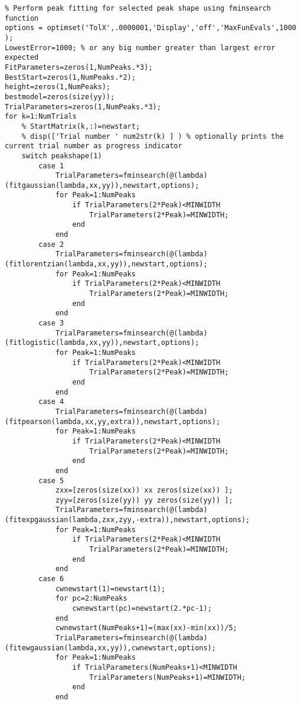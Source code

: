 \begin{lstlisting}
% Perform peak fitting for selected peak shape using fminsearch function
options = optimset('TolX',.0000001,'Display','off','MaxFunEvals',1000 );
LowestError=1000; % or any big number greater than largest error expected
FitParameters=zeros(1,NumPeaks.*3); 
BestStart=zeros(1,NumPeaks.*2); 
height=zeros(1,NumPeaks); 
bestmodel=zeros(size(yy));
TrialParameters=zeros(1,NumPeaks.*3);
for k=1:NumTrials
    % StartMatrix(k,:)=newstart;
    % disp(['Trial number ' num2str(k) ] ) % optionally prints the current trial number as progress indicator
    switch peakshape(1)
        case 1
            TrialParameters=fminsearch(@(lambda)(fitgaussian(lambda,xx,yy)),newstart,options);
            for Peak=1:NumPeaks
                if TrialParameters(2*Peak)<MINWIDTH
                    TrialParameters(2*Peak)=MINWIDTH;
                end
            end
        case 2
            TrialParameters=fminsearch(@(lambda)(fitlorentzian(lambda,xx,yy)),newstart,options);
            for Peak=1:NumPeaks
                if TrialParameters(2*Peak)<MINWIDTH
                    TrialParameters(2*Peak)=MINWIDTH;
                end
            end
        case 3
            TrialParameters=fminsearch(@(lambda)(fitlogistic(lambda,xx,yy)),newstart,options);
            for Peak=1:NumPeaks
                if TrialParameters(2*Peak)<MINWIDTH
                    TrialParameters(2*Peak)=MINWIDTH;
                end
            end
        case 4
            TrialParameters=fminsearch(@(lambda)(fitpearson(lambda,xx,yy,extra)),newstart,options);
            for Peak=1:NumPeaks
                if TrialParameters(2*Peak)<MINWIDTH
                    TrialParameters(2*Peak)=MINWIDTH;
                end
            end
        case 5
            zxx=[zeros(size(xx)) xx zeros(size(xx)) ];
            zyy=[zeros(size(yy)) yy zeros(size(yy)) ];
            TrialParameters=fminsearch(@(lambda)(fitexpgaussian(lambda,zxx,zyy,-extra)),newstart,options);
            for Peak=1:NumPeaks
                if TrialParameters(2*Peak)<MINWIDTH
                    TrialParameters(2*Peak)=MINWIDTH;
                end
            end
        case 6
            cwnewstart(1)=newstart(1);
            for pc=2:NumPeaks
                cwnewstart(pc)=newstart(2.*pc-1);
            end
            cwnewstart(NumPeaks+1)=(max(xx)-min(xx))/5;
            TrialParameters=fminsearch(@(lambda)(fitewgaussian(lambda,xx,yy)),cwnewstart,options);
            for Peak=1:NumPeaks
                if TrialParameters(NumPeaks+1)<MINWIDTH
                    TrialParameters(NumPeaks+1)=MINWIDTH;
                end
            end

\end{lstlisting}
